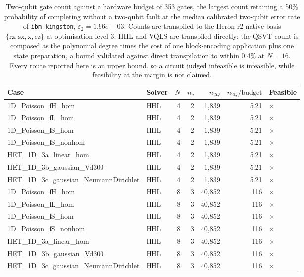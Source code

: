 \begin{table}[htbp]
  \centering
  \caption{Two-qubit gate count against a hardware budget of 353 gates, the largest count retaining a 50\% probability of completing without a two-qubit fault at the median calibrated two-qubit error rate of \texttt{ibm\_kingston}, $\varepsilon_2 = 1.96e-03$. Counts are transpiled to the Heron r2 native basis $\{\mathrm{rz}, \mathrm{sx}, \mathrm{x}, \mathrm{cz}\}$ at optimisation level 3. HHL and VQLS are transpiled directly; the QSVT count is composed as the polynomial degree times the cost of one block-encoding application plus one state preparation, a bound validated against direct transpilation to within 0.4\% at $N=16$. Every route reported here is an upper bound, so a circuit judged infeasible is infeasible, while feasibility at the margin is not claimed.}
  \label{tab:hardware_feasibility}
  \begin{tabular}{llrrrrl}
    \toprule
    Case & Solver & $N$ & $n_q$ & $n_{2Q}$ & $n_{2Q}/\mathrm{budget}$ & Feasible \\
    \midrule
    1D\_Poisson\_fH\_hom & HHL & 4 & 2 & 1,839 & 5.21 & $\times$ \\
    1D\_Poisson\_fL\_hom & HHL & 4 & 2 & 1,839 & 5.21 & $\times$ \\
    1D\_Poisson\_fS\_hom & HHL & 4 & 2 & 1,839 & 5.21 & $\times$ \\
    1D\_Poisson\_fS\_nonhom & HHL & 4 & 2 & 1,839 & 5.21 & $\times$ \\
    HET\_1D\_3a\_linear\_hom & HHL & 4 & 2 & 1,839 & 5.21 & $\times$ \\
    HET\_1D\_3b\_gaussian\_Vd300 & HHL & 4 & 2 & 1,839 & 5.21 & $\times$ \\
    HET\_1D\_3c\_gaussian\_NeumannDirichlet & HHL & 4 & 2 & 1,839 & 5.21 & $\times$ \\
    1D\_Poisson\_fH\_hom & HHL & 8 & 3 & 40,852 & 116 & $\times$ \\
    1D\_Poisson\_fL\_hom & HHL & 8 & 3 & 40,852 & 116 & $\times$ \\
    1D\_Poisson\_fS\_hom & HHL & 8 & 3 & 40,852 & 116 & $\times$ \\
    1D\_Poisson\_fS\_nonhom & HHL & 8 & 3 & 40,852 & 116 & $\times$ \\
    HET\_1D\_3a\_linear\_hom & HHL & 8 & 3 & 40,852 & 116 & $\times$ \\
    HET\_1D\_3b\_gaussian\_Vd300 & HHL & 8 & 3 & 40,852 & 116 & $\times$ \\
    HET\_1D\_3c\_gaussian\_NeumannDirichlet & HHL & 8 & 3 & 40,852 & 116 & $\times$ \\

\end{tabular}
\end{table}
